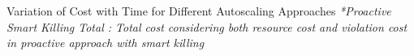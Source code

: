 Variation of Cost with Time for Different Autoscaling Approaches
\textit{*Proactive Smart Killing Total : Total cost considering both resource cost and violation cost in proactive approach with smart killing}